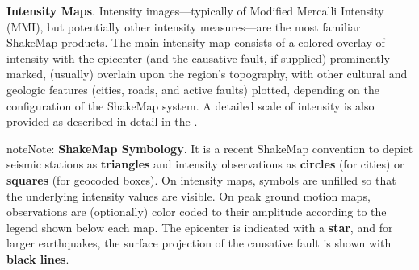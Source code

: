 \documentclass[letterpaper,10pt,english]{sphinxmanual}
\begin{document}
\textbf{Intensity Maps}. Intensity images---typically of Modified Mercalli Intensity
(MMI), but potentially other intensity measures---are the most familiar ShakeMap
products. The main intensity map consists of a colored overlay of intensity with
the epicenter (and the causative fault, if supplied) prominently marked,
(usually) overlain upon the region’s topography, with other cultural and
geologic features (cities, roads, and active faults) plotted, depending on the
configuration of the ShakeMap system. A detailed scale of intensity is also
provided as described in detail in the {\hyperref[technical_guide:technical\string-guide]{}}.

\begin{notice}{note}{Note:}
\textbf{ShakeMap Symbology}. It is a recent ShakeMap convention to depict seismic stations as \textbf{triangles} and intensity observations as \textbf{circles} (for cities) or \textbf{squares} (for geocoded boxes). On intensity maps, symbols are unfilled so that the underlying intensity values are visible. On peak ground motion maps, observations are (optionally) color coded to their amplitude according to the legend shown below each map. The epicenter is indicated with a \textbf{star}, and for larger earthquakes, the surface projection of the causative fault is shown with \textbf{black lines}.
\end{notice}
\end{document}
